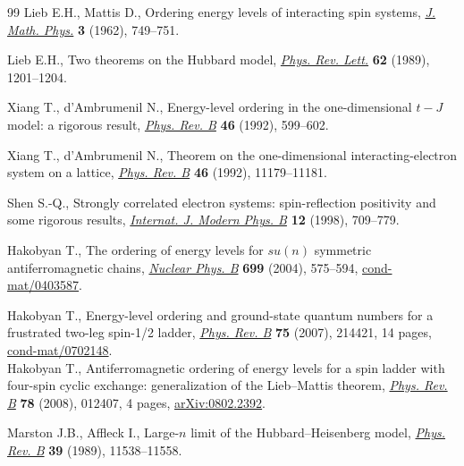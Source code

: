 \documentclass[11pt]{article}
\begin{document}
\begin{thebibliography}{99}
Lieb E.H., Mattis D.,
Ordering energy levels of interacting spin systems,
\href{http://dx.doi.org/10.1063/1.1724276}{{\it J. Math. Phys.}} {\bf 3} (1962), 749--751.

Lieb E.H.,
Two theorems on the Hubbard model,
\href{http://dx.doi.org/10.1103/PhysRevLett.62.1201}{{\it Phys. Rev. Lett.}} {\bf 62} (1989), 1201--1204.

Xiang T., d'Ambrumenil N.,
Energy-level ordering in the one-dimensional $t-J$ model: a rigorous result,
\href{http://dx.doi.org/10.1103/PhysRevB.46.599}{{\it Phys. Rev. B}} {\bf 46} (1992), 599--602.

Xiang T., d'Ambrumenil N.,
Theorem on the one-dimensional interacting-electron system on a lattice,
\href{http://dx.doi.org/10.1103/PhysRevB.46.11179}{{\it Phys. Rev. B}} {\bf 46}  (1992), 11179--11181.

Shen S.-Q.,
Strongly correlated electron systems: spin-ref\/lection positivity and some rigorous results,
\href{http://dx.doi.org/10.1142/S0217979298000442}{{\it Internat. J. Modern Phys. B}} {\bf 12} (1998), 709--779.


Hakobyan T.,
The ordering of energy levels for $su(n)$ symmetric antiferromagnetic chains,
\href{http://dx.doi.org/10.1016/j.nuclphysb.2004.07.032}{{\it  Nuclear Phys. B}} {\bf 699} (2004), 575--594,
\href{http://arxiv.org/abs/cond-mat/0403587}{cond-mat/0403587}.


Hakobyan T.,
Energy-level ordering and ground-state quantum numbers for a frustrated two-leg spin-1/2 ladder,
\href{http://dx.doi.org/10.1103/PhysRevB.75.214421}{{\it Phys. Rev. B}}  {\bf 75} (2007), 214421, 14 pages,
\href{http://arxiv.org/abs/cond-mat/0702148}{cond-mat/0702148}. \\
Hakobyan T.,
Antiferromagnetic ordering of energy levels for a spin ladder with four-spin cyclic exchange: generalization of the Lieb--Mattis theorem,
\href{http://dx.doi.org/10.1103/PhysRevB.78.012407}{{\it Phys. Rev. B}} {\bf 78} (2008), 012407, 4 pages,
\href{http://arxiv.org/abs/0802.2392}{arXiv:0802.2392}.

Marston J.B., Af\/f\/leck I.,
Large-$n$ limit of the Hubbard--Heisenberg model,
\href{http://dx.doi.org/10.1103/PhysRevB.39.11538}{{\it Phys. Rev. B}} {\bf 39} (1989), 11538--11558.




\end{thebibliography}
\end{document}
